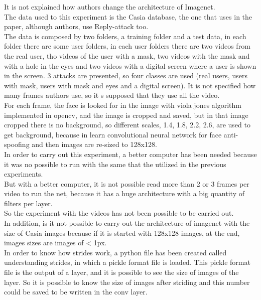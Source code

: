 It is not explained how authors change the architecture of Imagenet.\\

The data used to this experiment is the Casia database, the one that uses in the paper, although authors, use Reply-attack too.\\

The data is composed by two folders, a training folder and a test data, in each folder there are some user folders, in each user folders there are two videos from the real user, tho videos of the user with a mask, two videos with the mask and with a hole in the eyes and two videos with a digital screen where a user is shown in the screen. 3 attacks are presented, so four classes are used (real users, users with mask, users with mask and eyes and a digital screen). It is not specified how many frames authors use, so it s supposed that they use all the video.\\

For each frame, the face is looked for in the image with viola jones algorithm implemented in opencv, and the image is cropped and saved, but in that image cropped there is no background, so different scales, 1.4, 1.8, 2.2, 2.6, are used to get background, because in learn convolutional neural network for face anti-spoofing and then images are re-sized to 128x128.\\

In order to carry out this experiment, a better computer has been needed because it was no possible to run with the same that the utilized in the previous experiments.\\

But with a better computer, it is not possible read more than 2 or 3 frames per video to run the net, because it has a huge architecture with a big quantity of filters per layer.\\

So the experiment with the videos has not been possible to be carried out.\\

In addition, is it not possible to carry out the architecture of imagenet with the size of Casia images because if it is started with 128x128 images, at the end,  images sizes are images of < 1px.\\

In order to know how strides work, a python file has been created called understanding strides, in which a pickle format file is loaded. This pickle format file is the output of a layer, and it is possible to see the size of images of the layer. So it is possible to know the size of images after striding and this number could be saved to be written in the conv layer.\\


